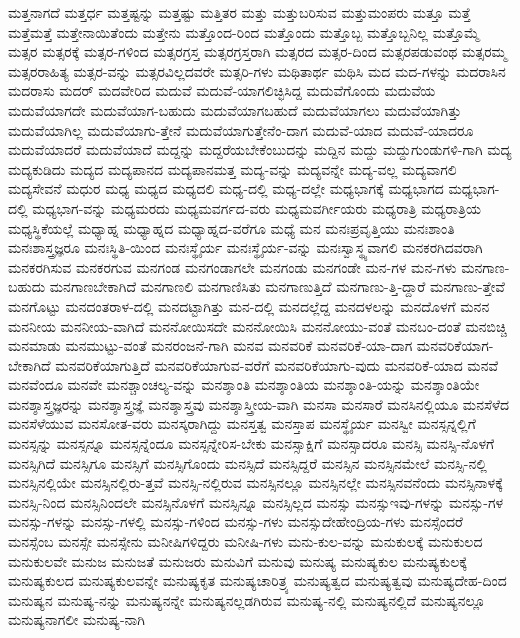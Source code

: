{ಮತ್ತನಾಗದೆ
ಮತ್ತರ್ಧ
ಮತ್ತಷ್ಟನ್ನು
ಮತ್ತಷ್ಟು
ಮತ್ತಿತರ
ಮತ್ತು
ಮತ್ತುಬರಿಸುವ
ಮತ್ತುಮಂಪರು
ಮತ್ತೂ
ಮತ್ತೆ
ಮತ್ತೆಮತ್ತೆ
ಮತ್ತೇನಾಯಿತೆಂದು
ಮತ್ತೇನು
ಮತ್ತೊಂದ-ರಿಂದ
ಮತ್ತೊಂದು
ಮತ್ತೊಬ್ಬ
ಮತ್ತೊಬ್ಬನಿಲ್ಲ
ಮತ್ತೊಮ್ಮೆ
ಮತ್ಸರ
ಮತ್ಸರಕ್ಕೆ
ಮತ್ಸರ-ಗಳಿಂದ
ಮತ್ಸರಗ್ರಸ್ತ
ಮತ್ಸರಗ್ರಸ್ತರಾಗಿ
ಮತ್ಸರದ
ಮತ್ಸರ-ದಿಂದ
ಮತ್ಸರಪಡುವಂಥ
ಮತ್ಸರಮ್ಮ
ಮತ್ಸರರಾಹಿತ್ಯ
ಮತ್ಸರ-ವನ್ನು
ಮತ್ಸರವಿಲ್ಲದವರೇ
ಮತ್ಸರಿ-ಗಳು
ಮಥಿತಾರ್ಥ
ಮಥಿಸಿ
ಮದ
ಮದ-ಗಳನ್ನು
ಮದರಾಸಿನ
ಮದರಾಸು
ಮದರ್
ಮದವೇರಿದ
ಮದುವೆ
ಮದುವೆ-ಯಾಗಲಿಚ್ಛಿಸಿದ್ದ
ಮದುವೆಗೊಂದು
ಮದುವೆಯ
ಮದುವೆಯಾಗದೇ
ಮದುವೆಯಾಗ-ಬಹುದು
ಮದುವೆಯಾಗಬಹುದೆ
ಮದುವೆಯಾಗಲು
ಮದುವೆಯಾಗಿತ್ತು
ಮದುವೆಯಾಗಿಲ್ಲ
ಮದುವೆಯಾಗು-ತ್ತೇನೆ
ಮದುವೆಯಾಗುತ್ತೇನೆಂ-ದಾಗ
ಮದುವೆ-ಯಾದ
ಮದುವೆ-ಯಾದರೂ
ಮದುವೆಯಾದರೆ
ಮದುವೆಯಾದೆ
ಮದ್ದನ್ನು
ಮದ್ದರೆಯಬೇಕೆಂಬುದನ್ನು
ಮದ್ದಿನ
ಮದ್ದು
ಮದ್ದುಗುಂಡುಗಳಿ-ಗಾಗಿ
ಮದ್ಯ
ಮದ್ಯಕುಡಿದು
ಮದ್ಯದ
ಮದ್ಯಪಾನದ
ಮದ್ಯಪಾನಮತ್ತ
ಮದ್ಯ-ವನ್ನು
ಮದ್ಯವನ್ನೇ
ಮದ್ಯ-ವಲ್ಲ
ಮದ್ಯವಾಗಲಿ
ಮದ್ಯಸೇವನೆ
ಮಧುರ
ಮಧ್ಯ
ಮಧ್ಯದ
ಮಧ್ಯದಲಿ
ಮಧ್ಯ-ದಲ್ಲಿ
ಮಧ್ಯ-ದಲ್ಲೇ
ಮಧ್ಯಭಾಗಕ್ಕೆ
ಮಧ್ಯಭಾಗದ
ಮಧ್ಯಭಾಗ-ದಲ್ಲಿ
ಮಧ್ಯಭಾಗ-ವನ್ನು
ಮಧ್ಯಮರದು
ಮಧ್ಯಮವರ್ಗದ-ವರು
ಮಧ್ಯಮವರ್ಗೀಯರು
ಮಧ್ಯರಾತ್ರಿ
ಮಧ್ಯರಾತ್ರಿಯ
ಮಧ್ಯಸ್ಥಿಕೆಯಲ್ಲೆ
ಮಧ್ಯಾಹ್ನ
ಮಧ್ಯಾಹ್ನದ
ಮಧ್ಯಾಹ್ನದ-ವರೆಗೂ
ಮಧ್ಯೆ
ಮನ
ಮನಃಪ್ರವೃತ್ತಿಯು
ಮನಃಶಾಂತಿ
ಮನಃಶಾಸ್ತ್ರಜ್ಞರೂ
ಮನಃಸ್ಥಿತಿ-ಯಿಂದ
ಮನಃಸ್ಥೈರ್ಯ
ಮನಃಸ್ಥೈರ್ಯ-ವನ್ನು
ಮನಃಸ್ವಾಸ್ಥ್ಯವಾಗಲಿ
ಮನಕರಗಿದವರಾಗಿ
ಮನಕರಗಿಸುವ
ಮನಕರಗುವ
ಮನಗಂಡ
ಮನಗಂಡಾಗಲೇ
ಮನಗಂಡು
ಮನಗಂಡೇ
ಮನ-ಗಳ
ಮನ-ಗಳು
ಮನಗಾಣ-ಬಹುದು
ಮನಗಾಣಬೇಕಾಗಿದೆ
ಮನಗಾಣಲಿ
ಮನಗಾಣಿಸಿತು
ಮನಗಾಣುತ್ತಿದೆ
ಮನಗಾಣು-ತ್ತಿ-ದ್ದಾರೆ
ಮನಗಾಣು-ತ್ತೇವೆ
ಮನಗೊಟ್ಟು
ಮನದಂತರಾಳ-ದಲ್ಲಿ
ಮನದಟ್ಟಾಗಿತ್ತು
ಮನ-ದಲ್ಲಿ
ಮನದಲ್ಲೆದ್ದ
ಮನದಳಲನ್ನು
ಮನದೊಳಗೆ
ಮನನ
ಮನನೀಯ
ಮನನೀಯ-ವಾಗಿದೆ
ಮನನೋಯಿಸದೇ
ಮನನೋಯಿಸಿ
ಮನನೋಯು-ವಂತೆ
ಮನಬಂ-ದಂತೆ
ಮನಬಿಚ್ಚಿ
ಮನಮಾಡು
ಮನಮುಟ್ಟು-ವಂತೆ
ಮನರಂಜನೆ-ಗಾಗಿ
ಮನವ
ಮನವರಿಕೆ
ಮನವರಿಕೆ-ಯಾ-ದಾಗ
ಮನವರಿಕೆಯಾಗ-ಬೇಕಾಗಿದೆ
ಮನವರಿಕೆಯಾಗುತ್ತಿದೆ
ಮನವರಿಕೆಯಾಗುವ-ವರೆಗೆ
ಮನವರಿಕೆಯಾಗು-ವುದು
ಮನವರಿಕೆ-ಯಾದ
ಮನವೆ
ಮನವೆಂದೂ
ಮನವೇ
ಮನಶ್ಚಾಂಚಲ್ಯ-ವನ್ನು
ಮನಶ್ಶಾಂತಿ
ಮನಶ್ಶಾಂತಿಯ
ಮನಶ್ಶಾಂತಿ-ಯನ್ನು
ಮನಶ್ಶಾಂತಿಯೇ
ಮನಶ್ಶಾಸ್ತ್ರಜ್ಞರನ್ನು
ಮನಶ್ಶಾಸ್ತ್ರಜ್ಞೆ
ಮನಶ್ಶಾಸ್ತ್ರವು
ಮನಶ್ಶಾಸ್ತ್ರೀಯ-ವಾಗಿ
ಮನಸಾ
ಮನಸಾರೆ
ಮನಸಿನಲ್ಲಿಯೂ
ಮನಸೆಳೆದ
ಮನಸೆಳೆಯುವ
ಮನಸೋತ-ವರು
ಮನಸ್ಕರಾಗಿದ್ದು
ಮನಸ್ತತ್ವ
ಮನಸ್ತಾಪ
ಮನಸ್ಥೈರ್ಯ
ಮನಸ್ವೀ
ಮನಸ್ಸನ್ನಲ್ಲಿಗೆ
ಮನಸ್ಸನ್ನು
ಮನಸ್ಸನ್ನೂ
ಮನಸ್ಸನ್ನೆಂದೂ
ಮನಸ್ಸನ್ನೇರಿಸ-ಬೇಕು
ಮನಸ್ಸಾಕ್ಷಿಗೆ
ಮನಸ್ಸಾದರೂ
ಮನಸ್ಸಿ
ಮನಸ್ಸಿ-ನೊಳಗೆ
ಮನಸ್ಸಿಗಿದೆ
ಮನಸ್ಸಿಗೂ
ಮನಸ್ಸಿಗೆ
ಮನಸ್ಸಿಗೊಂದು
ಮನಸ್ಸಿದೆ
ಮನಸ್ಸಿದ್ದರೆ
ಮನಸ್ಸಿನ
ಮನಸ್ಸಿನಮೇಲೆ
ಮನಸ್ಸಿ-ನಲ್ಲಿ
ಮನಸ್ಸಿನಲ್ಲಿಯೇ
ಮನಸ್ಸಿನಲ್ಲಿರು-ತ್ತವೆ
ಮನಸ್ಸಿ-ನಲ್ಲಿರುವ
ಮನಸ್ಸಿನಲ್ಲೂ
ಮನಸ್ಸಿನಲ್ಲೇ
ಮನಸ್ಸಿನವನೆಂದು
ಮನಸ್ಸಿನಾಳಕ್ಕೆ
ಮನಸ್ಸಿ-ನಿಂದ
ಮನಸ್ಸಿನಿಂದಲೇ
ಮನಸ್ಸಿನೊಳಗೆ
ಮನಸ್ಸಿನ್ನೂ
ಮನಸ್ಸಿಲ್ಲದ
ಮನಸ್ಸು
ಮನಸ್ಸುಇವು-ಗಳನ್ನು
ಮನಸ್ಸು-ಗಳ
ಮನಸ್ಸು-ಗಳನ್ನು
ಮನಸ್ಸು-ಗಳಲ್ಲಿ
ಮನಸ್ಸು-ಗಳಿಂದ
ಮನಸ್ಸು-ಗಳು
ಮನಸ್ಸುದೇಹೇಂದ್ರಿಯ-ಗಳು
ಮನಸ್ಸೆಂದರೆ
ಮನಸ್ಸೆಂಬ
ಮನಸ್ಸೇ
ಮನಸ್ಸೇನು
ಮನೀಷಿಗಳಿದ್ದರು
ಮನೀಷಿ-ಗಳು
ಮನು-ಕುಲ-ವನ್ನು
ಮನುಕುಲಕ್ಕೆ
ಮನುಕುಲದ
ಮನುಕುಲವೇ
ಮನುಜ
ಮನುಜತೆ
ಮನುಜರು
ಮನುವಿಗೆ
ಮನುವು
ಮನುಷ್ಯ
ಮನುಷ್ಯಕುಲ
ಮನುಷ್ಯಕುಲಕ್ಕೆ
ಮನುಷ್ಯಕುಲದ
ಮನುಷ್ಯಕುಲವನ್ನೇ
ಮನುಷ್ಯಕೃತ
ಮನುಷ್ಯಚಾರಿತ್ರ್ಯ
ಮನುಷ್ಯತ್ವದ
ಮನುಷ್ಯತ್ವವು
ಮನುಷ್ಯದೇಹ-ದಿಂದ
ಮನುಷ್ಯನ
ಮನುಷ್ಯ-ನನ್ನು
ಮನುಷ್ಯನನ್ನೇ
ಮನುಷ್ಯನಲ್ಲಡಗಿರುವ
ಮನುಷ್ಯ-ನಲ್ಲಿ
ಮನುಷ್ಯನಲ್ಲಿದೆ
ಮನುಷ್ಯನಲ್ಲೂ
ಮನುಷ್ಯನಾಗಲೀ
ಮನುಷ್ಯ-ನಾಗಿ
}
